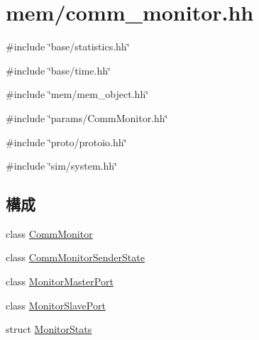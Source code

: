 \hypertarget{comm__monitor_8hh}{
\section{mem/comm\_\-monitor.hh}
\label{comm__monitor_8hh}
}
{\ttfamily \#include \char`\"{}base/statistics.hh\char`\"{}}\par
{\ttfamily \#include \char`\"{}base/time.hh\char`\"{}}\par
{\ttfamily \#include \char`\"{}mem/mem\_\-object.hh\char`\"{}}\par
{\ttfamily \#include \char`\"{}params/CommMonitor.hh\char`\"{}}\par
{\ttfamily \#include \char`\"{}proto/protoio.hh\char`\"{}}\par
{\ttfamily \#include \char`\"{}sim/system.hh\char`\"{}}\par
\subsection*{構成}
\begin{DoxyCompactItemize}
\item 
class \hyperlink{classCommMonitor}{CommMonitor}
\item 
class \hyperlink{classCommMonitor_1_1CommMonitorSenderState}{CommMonitorSenderState}
\item 
class \hyperlink{classCommMonitor_1_1MonitorMasterPort}{MonitorMasterPort}
\item 
class \hyperlink{classCommMonitor_1_1MonitorSlavePort}{MonitorSlavePort}
\item 
struct \hyperlink{structCommMonitor_1_1MonitorStats}{MonitorStats}
\end{DoxyCompactItemize}
